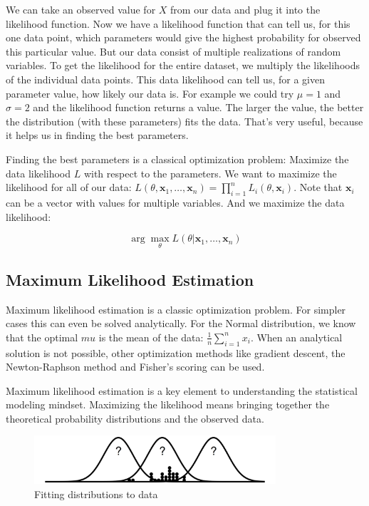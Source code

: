 \documentclass[
  10pt,
]{scrbook}
\begin{document}
We can take an observed value for \(X\) from our data and plug it into the likelihood function.
Now we have a likelihood function that can tell us, for this one data point, which parameters would give the highest probability for observed this particular value.
But our data consist of multiple realizations of random variables.
To get the likelihood for the entire dataset, we multiply the likelihoods of the individual data points.
This data likelihood can tell us, for a given parameter value, how likely our data is.
For example we could try \(\mu = 1\) and \(\sigma = 2\) and the likelihood function returns a value.
The larger the value, the better the distribution (with these parameters) fits the data.
That's very useful, because it helps us in finding the best parameters.

Finding the best parameters is a classical optimization problem:
Maximize the data likelihood \(L\) with respect to the parameters.
We want to maximize the likelihood for all of our data: \(L(\theta, \mathbf{x}_1, \ldots, \mathbf{x}_n) = \prod_{i=1}^n L_i(\theta, \mathbf{x}_i)\).
Note that \(\mathbf{x}_i\) can be a vector with values for multiple variables.
And we maximize the data likelihood:

\[\arg \max_{\theta} L(\theta | \mathbf{x}_1, \ldots, \mathbf{x}_n)\]

\hypertarget{maximum-likelihood-estimation}{%
\subsection*{Maximum Likelihood Estimation}\label{maximum-likelihood-estimation}}


Maximum likelihood estimation is a classic optimization problem.
For simpler cases this can even be solved analytically.
For the Normal distribution, we know that the optimal \(mu\) is the mean of the data: \(\frac{1}{n} \sum_{i=1}^n x_i\).
When an analytical solution is not possible, other optimization methods like gradient descent, the Newton-Raphson method and Fisher's scoring can be used.

Maximum likelihood estimation is a key element to understanding the statistical modeling mindset.
Maximizing the likelihood means bringing together the theoretical probability distributions and the observed data.

\begin{figure}

{\centering \includegraphics[width=0.8\textwidth]{figures/fit-1} 

}

\caption{Fitting distributions to data}\label{fig:fit}
\end{figure}
\end{document}
